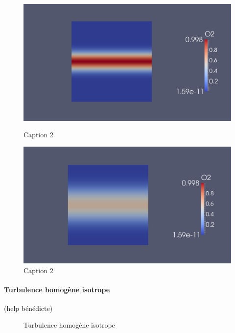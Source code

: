 \begin{figure}	
  \centering
  \begin{minipage}{.5\textwidth}
    \centering
    \includegraphics[width=.9\linewidth]{figures/diff_0.png}
    \caption{\label{fig:diff_0}Caption 2}
  \end{minipage}%
  \begin{minipage}{.5\textwidth}
    \centering
    \includegraphics[width=.9\linewidth]{figures/diff_325.png}
    \caption{\label{fig:diff_325}Caption 2}
  \end{minipage}
\end{figure}


\paragraph{Turbulence homogène isotrope}
(help bénédicte)

\begin{figure}[ht]
  \centering
  \caption{\label{fig:turbiso}Turbulence homogène isotrope}
\end{figure}



